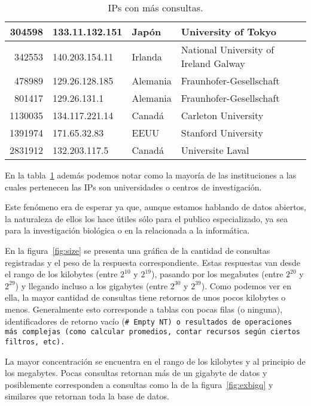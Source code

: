 \begin{table}[ht]
\begin{tabular}{|r|l|l|l|}
    304598  & 133.11.132.151  & Japón          
                   & University of Tokyo\\\hline
    342553  & 140.203.154.11  & Irlanda        
                   & National University of Ireland Galway\\\hline
    478989  & 129.26.128.185  & Alemania       
                   & Fraunhofer-Gesellschaft\\\hline
    801417  & 129.26.131.1    & Alemania       
                   & Fraunhofer-Gesellschaft\\\hline
    1130035 & 134.117.221.14  & Canadá         
                   & Carleton University\\\hline
    1391974 & 171.65.32.83    & EEUU 
                   & Stanford University\\\hline
    2831912 & 132.203.117.5   & Canadá         
                   & Universite Laval\\\hline
  \end{tabular}
  \caption{IPs con más consultas.}\label{tab:ips}
\end{table}

En la tabla~\ref{tab:ips} además podemos notar como la mayoría de las
instituciones a las cuales pertenecen las IPs son universidades o centros de
investigación.

Este fenómeno era de esperar ya que, aunque estamos hablando de datos abiertos,
la naturaleza de ellos los hace útiles sólo para el publico especializado, ya
sea para la investigación biológica o en la relacionada a la informática.

En la figura~\ref{fig:size} se presenta una gráfica de la cantidad de consultas
registradas y el peso de la respuesta correspondiente. Estas respuestas van
desde el rango de los kilobytes (entre $2^{10}$ y $2^{19}$), pasando por los
megabutes (entre $2^{20}$ y $2^{29}$) y llegando incluso a los gigabytes (entre
$2^{30}$ y  $2^{39}$).
Como podemos ver en ella, la mayor cantidad de consultas tiene retornos de unos
pocos kilobytes o menos.
Generalmente esto corresponde a tablas con pocas filas (o ninguna),
identificadores de retorno vacío (\tt{\# Empty NT}) o resultados de operaciones
más complejas (como calcular promedios, contar recursos según ciertos filtros,
etc).

La mayor concentración se encuentra en el rango de los kilobytes y al principio
de los megabytes.
Pocas consultas retornan más de un gigabyte de datos y posiblemente
corresponden a consultas como la de la figura~\ref{fig:exbigq} y similares que
retornan toda la base de datos.

